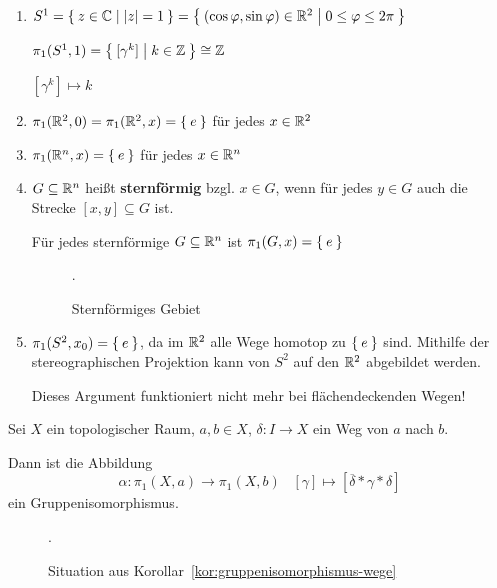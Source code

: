 \begin{beispiel}
    \begin{enumerate}[label=\arabic*)]
        \item $S^1 = \Set{z \in \ensuremath{\mathbb{C}}| {|z|} = 1} = \Set{(\cos \varphi, \sin \varphi) \in \ensuremath{\mathbb{R}}^2 | 0 \leq \varphi \leq 2 \pi}$

              $\pi_1 (S^1, 1) = \Set{[\gamma^k] | k \in \ensuremath{\mathbb{Z}}} \cong \mathbb{Z}$

              $[\gamma^k] \mapsto k$
        \item $\pi_1 (\mathbb{R}^2, 0) = \pi_1 (\mathbb{R}^2, x) = \Set{e}$ für jedes $x \in \mathbb{R}^2$
        \item $\pi_1 (\mathbb{R}^n, x) = \Set{e}$ für jedes $x \in \mathbb{R}^n$
        \item $G \subseteq \mathbb{R}^n$ heißt \textbf{sternförmig} bzgl. $x \in G$, 
            wenn für jedes $y \in G$ auch die Strecke $[x, y] \subseteq G$
            ist.

            Für jedes sternförmige $G \subseteq \mathbb{R}^n$ ist
            $\pi_1(G,x) = \Set{e}$

            \begin{figure}
                \centering
                
                \caption{Sternförmiges Gebiet}.
                \label{fig:sternfoermiges-gebiet}
            \end{figure}
        \item $\pi_1(S^2, x_0) = \Set{e}$, da im $\mathbb{R}^2$ alle Wege
              homotop zu $\Set{e}$ sind. Mithilfe der stereographischen
              Projektion kann von $S^2$ auf den $\mathbb{R}^2$ abgebildet
              werden.

              Dieses Argument funktioniert nicht mehr bei flächendeckenden
              Wegen!
    \end{enumerate}
\end{beispiel}

\begin{korollar}\label{kor:gruppenisomorphismus-wege}
    Sei $X$ ein topologischer Raum, $a,b \in X$, $\delta: I \rightarrow X$
    ein Weg von $a$ nach $b$.

    Dann ist die Abbildung
    \[\alpha: \pi_1 (X, a) \rightarrow \pi_1(X,b)\;\;\;[\gamma] \mapsto [\overline{\delta} * \gamma * \delta]\]
    ein Gruppenisomorphismus.
\end{korollar}

\begin{figure}
    \centering
    
    \caption{Situation aus Korollar~\ref{kor:gruppenisomorphismus-wege}}.
    \label{fig:situation-gruppenisomorphismus-wege}
\end{figure}


